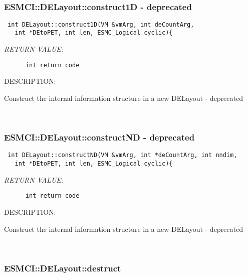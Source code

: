  
\mbox{}\hrulefill\
 
\subsubsection [ESMCI::DELayout::construct1D] {ESMCI::DELayout::construct1D - deprecated}


  
\begin{verbatim} int DELayout::construct1D(VM &vmArg, int deCountArg,
   int *DEtoPET, int len, ESMC_Logical cyclic){\end{verbatim}{\em RETURN VALUE:}
\begin{verbatim}      int return code\end{verbatim}
{\sf DESCRIPTION:\\ }


      Construct the internal information structure in a new DELayout
       - deprecated
   
 
\mbox{}\hrulefill\
 
\subsubsection [ESMCI::DELayout::constructND] {ESMCI::DELayout::constructND - deprecated}


  
\begin{verbatim} int DELayout::constructND(VM &vmArg, int *deCountArg, int nndim,
   int *DEtoPET, int len, ESMC_Logical cyclic){\end{verbatim}{\em RETURN VALUE:}
\begin{verbatim}      int return code\end{verbatim}
{\sf DESCRIPTION:\\ }


      Construct the internal information structure in a new DELayout
       - deprecated
   
 
\mbox{}\hrulefill\
 
\subsubsection [ESMCI::DELayout::destruct] {ESMCI::DELayout::destruct}


